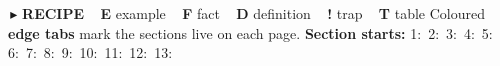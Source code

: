 \noindent\begin{minipage}[b]{\textwidth}
\begingroup
\fontsize{5.6pt}{6.7pt}\selectfont\sffamily
\noindent
{\colorbox{recFrame}{\color{white}\bfseries\,$\blacktriangleright$\,}}\,\textbf{RECIPE}\ \
{\colorbox{exFrame}{\color{white}\bfseries\,E\,}}\,example\ \
{\colorbox{thmFrame}{\color{white}\bfseries\,F\,}}\,fact\ \
{\colorbox{defFrame}{\color{white}\bfseries\,D\,}}\,definition\ \
{\colorbox{trapFrame}{\color{white}\bfseries\,!\,}}\,trap\ \
{\colorbox{tabFrame}{\color{white}\bfseries\,T\,}}\,table
\hfill
Coloured \textbf{edge tabs} mark the sections live on each page.
\hfill
\textbf{Section starts:}
1:\pageref{sec:1}\,
2:\pageref{sec:2}\,
3:\pageref{sec:3}\,
4:\pageref{sec:4}\,
5:\pageref{sec:5}\,
6:\pageref{sec:6}\,
7:\pageref{sec:7}\,
8:\pageref{sec:8}\,
9:\pageref{sec:9}\,
10:\pageref{sec:10}\,
11:\pageref{sec:11}\,
12:\pageref{sec:12}\,
13:\pageref{sec:13}
\par
\endgroup
\vspace{2.5pt}


\end{minipage}
